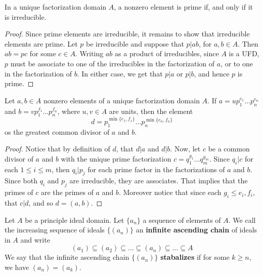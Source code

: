 \begin{lemma}\label{1.7.3}
    In a unique factorization domain $A$, a nonzero element is prime if, and
    only if it is irreducible.
\end{lemma}
\begin{proof}
    Since prime elements are irreducible, it remains to show that irreducible
    elements are prime. Let $p$ be irreducible and suppose that  $p|ab$, for
    $a,b \in A$. Then  $ab=pc$ for some  $c \in A$. Writing  $ab$ as a product
    of irreducibles, since  $A$ is a UFD,  $p$ must be associate to one of the
    irreducibles in the factorization of $a$, or to one in the factorization of
$b$. In either case, we get that $p|a$ or $p|b$, and hence  $p$ is prime.
\end{proof}

\begin{lemma}\label{1.7.4}
    Let $a,b \in A$ nonzero elements of a unique factorization domain $A$. If
    $a=up_1^{e_1} \dots p_n^{e_n}$ and $b=vp_1^{f_1} \dots p_n^{f_n}$, where
    $u,v \in A$ are units, then the element
    \begin{equation*}
        d=p_1^{\min\{e_1,f_1\}} \dots p_n^{\min\{e_n,f_n\}}
    \end{equation*}
    os the greatest common divisor of $a$ and  $b$.
\end{lemma}
\begin{proof}
    Notice that by definition of $d$, that  $d|a$ and  $d|b$. Now, let  $c$ be a
    common divisor of  $a$ and  $b$ with the unique prime factorization
    $c=q_1^{g_1} \dots q_m^{g_m}$. Since $q_i|c$ for each  $1 \leq i \leq m$,
    then  $q_i|p_j$ for each prime factor in the factorizations of  $a$ and
    $b$. Since both  $q_i$ and  $p_j$ are irreducible, they are associates. That
    implies that the primes of  $c$ are the primes of  $a$ and  $b$. Moreover
    notice that since each $g_i \leq e_i,f_i$, that  $c|d$, and so  $d=(a,b)$.
\end{proof}

\begin{definition}
    Let $A$ be a principle ideal domain. Let $\{a_n\}$ a sequence of elements of
    $A$. We call the increasing sequence of ideals  $\{(a_n)\}$ an
    \textbf{infinite ascending chain} of ideals in $A$ and write
    \begin{equation*}
        (a_1) \subseteq (a_2) \subseteq \dots \subseteq (a_n) \subseteq \dots
        \subseteq A
    \end{equation*}
    We say that the infinite ascending chain $\{(a_n)\}$ \textbf{stabalizes} if
    for some $k \geq n$, we have  $(a_n)=(a_k)$.
\end{definition}

